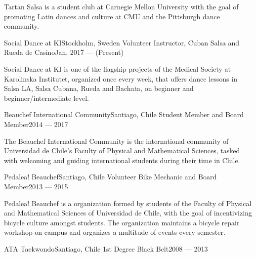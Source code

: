 \documentclass[letterpaper,11pt]{article}
\begin{document}
Tartan Salsa is a student club at Carnegie Mellon University with the goal of promoting Latin dances and culture at CMU and the Pittsburgh dance community.

\resumeSubheading
{Social Dance at KI}{Stockholm, Sweden}
{Volunteer Instructor, Cuban Salsa and Rueda de Casino}{Jan. 2017 --- (Present)}

Social Dance at KI is one of the flagship projects of the Medical Society at Karolinska Institutet, organized once every week, that offers dance lessons in Salsa LA, Salsa Cubana, Rueda and Bachata, on beginner and beginner/intermediate level.

\resumeSubheading
{Beauchef International Community}{Santiago, Chile}
{Student Member and Board Member}{2014 --- 2017}

The Beauchef International Community is the international community of Universidad de Chile's Faculty of Physical and Mathematical Sciences, tasked with welcoming and guiding international students during their time in Chile.

\resumeSubheading
{Pedalea! Beauchef}{Santiago, Chile}
{Volunteer Bike Mechanic and Board Member}{2013 --- 2015}

Pedalea! Beauchef is a organization formed by students of the Faculty of Physical and Mathematical Sciences of Universidad de Chile, with the goal of incentivizing bicycle culture amongst students. The organization maintains a bicycle repair workshop on campus and organizes a multitude of events every semester.

\resumeSubheading
{ATA Taekwondo}{Santiago, Chile}
{1st Degree Black Belt}{2008 --- 2013}

\resumeSubHeadingListEnd
\end{document}
